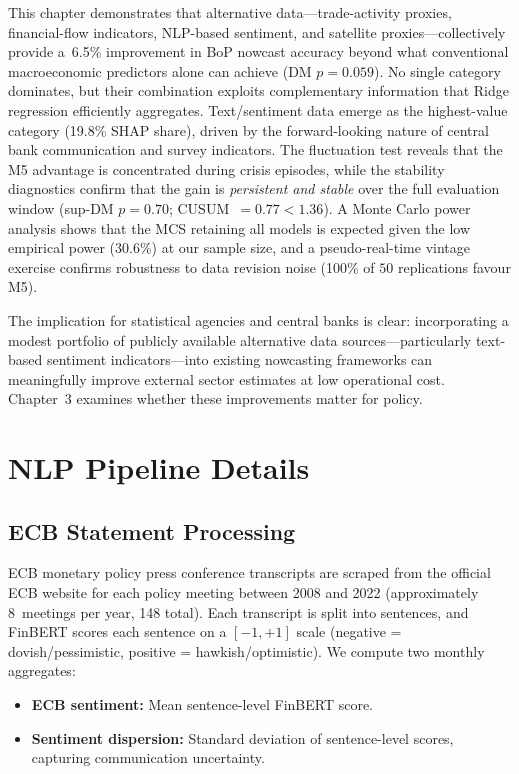This chapter demonstrates that alternative data---trade-activity proxies, financial-flow indicators, NLP-based sentiment, and satellite proxies---collectively provide a~6.5\% improvement in BoP nowcast accuracy beyond what conventional macroeconomic predictors alone can achieve (DM $p = 0.059$).  No single category dominates, but their combination exploits complementary information that Ridge regression efficiently aggregates.  Text/sentiment data emerge as the highest-value category (19.8\% SHAP share), driven by the forward-looking nature of central bank communication and survey indicators.  The \citet{giacomini2010forecast} fluctuation test reveals that the M5 advantage is concentrated during crisis episodes, while the \citet{rossi2013advances} stability diagnostics confirm that the gain is \emph{persistent and stable} over the full evaluation window (sup-DM $p = 0.70$; CUSUM~$= 0.77 < 1.36$).  A Monte Carlo power analysis shows that the MCS retaining all models is expected given the low empirical power ($30.6$\%) at our sample size, and a pseudo-real-time vintage exercise confirms robustness to data revision noise (100\% of $50$ replications favour M5).

The implication for statistical agencies and central banks is clear: incorporating a modest portfolio of publicly available alternative data sources---particularly text-based sentiment indicators---into existing nowcasting frameworks can meaningfully improve external sector estimates at low operational cost.  Chapter~3 examines whether these improvements matter for policy.


\appendix
\section{NLP Pipeline Details}
\label{app:nlp}

\subsection{ECB Statement Processing}

ECB monetary policy press conference transcripts are scraped from the official ECB website for each policy meeting between 2008 and 2022 (approximately 8~meetings per year, 148 total).  Each transcript is split into sentences, and FinBERT \citep{araci2019finbert} scores each sentence on a $[-1, +1]$ scale (negative = dovish/pessimistic, positive = hawkish/optimistic).  We compute two monthly aggregates:
\begin{itemize}
  \item \textbf{ECB sentiment:} Mean sentence-level FinBERT score.
  \item \textbf{Sentiment dispersion:} Standard deviation of sentence-level scores, capturing communication uncertainty.
\end{itemize}

